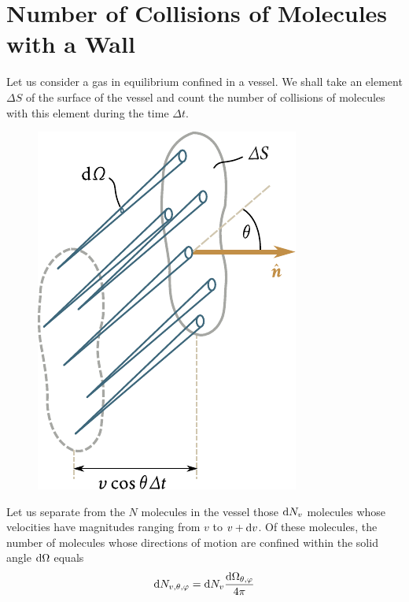 \section{Number of Collisions of Molecules with a Wall}\label{sec:11_3}

Let us consider a gas in equilibrium confined in a vessel. We shall take an element $\Delta S$ of the surface of the vessel and count the number of collisions of molecules with this element during the time $\Delta t$.

\begin{figure}[t]
	\begin{center}
		\includegraphics[scale=1.0]{figures/ch_11/fig_11_5.pdf}
		\caption[]{}
		\label{fig:11_5}
	\end{center}
	\vspace{-0.8cm}
\end{figure}

Let us separate from the $N$ molecules in the vessel those $\mathrm{d} N_v$ molecules whose velocities have magnitudes ranging from $v$ to $v+\mathrm{d} v$. Of these molecules, the number of molecules whose directions of motion are confined within the solid angle $\mathrm{d}\Omega$ equals
\begin{equation}\label{eq:11_18}
	\mathrm{d} N_{v,\theta,\varphi} = \mathrm{d} N_v \frac{\mathrm{d}\Omega_{\theta,\varphi}}{4\pi}
\end{equation}

